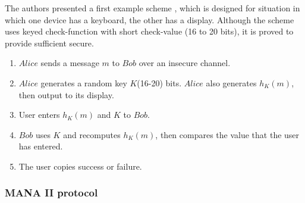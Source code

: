 The authors presented a first example scheme \cite{Mitchell:2004p25948}, which is designed for situation in which one device has a keyboard, the other has a display. Although the scheme uses keyed check-function with short check-value (16 to 20 bits), it is proved to provide sufficient secure. 

\begin{enumerate}
\item $Alice$ sends a message $m$ to $Bob$ over an insecure channel. 
\item $Alice$ generates a random key $K$(16-20) bits. $Alice$ also generates $h_K(m)$, then output to its display.
\item User enters $h_K(m)$ and $K$ to $Bob$.
\item $Bob$ uses $K$ and recomputes $h_K(m)$, then compares the value that the user has entered.
\item The user copies success or failure. 
\end{enumerate}

\begin{center}
\end{center}

\subsubsection*{MANA II protocol}

